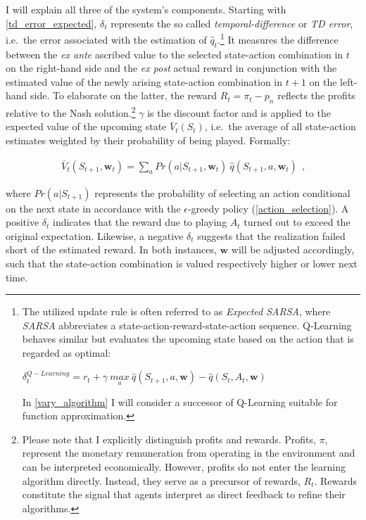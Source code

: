 I will explain all three of the system's components. Starting with \autoref{td_error_expected}, $\delta_t$ represents the so called \emph{temporal-difference} or \emph{TD error}, i.e.\ the error associated with the estimation of $\hat{q}_t$.\footnote{The utilized update rule is often referred to as \emph{Expected SARSA}, where \emph{SARSA} abbreviates a state-action-reward-state-action sequence. Q-Learning behaves similar but evaluates the upcoming state based on the action that is regarded as optimal:
	\begin{center}
		$\delta_t^{Q-Learning} = r_t + \gamma ~ \underset{a}{max} ~ \hat{q}(S_{t+1}, a, \boldsymbol{w}) - \hat{q}(S_t, A_t, \boldsymbol{w})$
	\end{center}
	In \autoref{vary_algorithm} I will consider a successor of Q-Learning suitable for function approximation.} It measures the difference between the \emph{ex ante} ascribed value to the selected state-action combination in $t$ on the right-hand side and the \emph{ex post} actual reward in conjunction with the estimated value of the newly arising state-action combination in $t+1$ on the left-hand side. To elaborate on the latter, the reward $R_t = \pi_t - p_n$ reflects the profits relative to the Nash solution.\footnote{Please note that I explicitly distinguish profits and rewards. Profits, $\pi$, represent the monetary remuneration from operating in the environment and can be interpreted economically. However, profits do not enter the learning algorithm directly. Instead, they serve as a precursor of rewards, $R_t$. Rewards constitute the signal that agents interpret as direct feedback to refine their algorithms.} $\gamma$ is the discount factor and is applied to the expected value of the upcoming state $\bar{V}_t(S_t)$, i.e.\ the average of all state-action estimates weighted by their probability of being played. Formally:

\begin{gather}\label{expected_state_value}
\bar{V}_t(S_{t+1}, \boldsymbol{w}_t) = \sum_{a} Pr(a|S_{t+1}, \boldsymbol{w}_t) ~ \hat{q}(S_{t+1}, a, \boldsymbol{w}_t) ~~   \text{,}
\end{gather}

where $Pr(a|S_{t+1})$ represents the probability of selecting an action conditional on the next state in accordance with the $\epsilon$-greedy policy (\autoref{action_selection}). A positive $\delta_t$ indicates that the reward due to playing $A_t$ turned out to exceed the original expectation. Likewise, a negative $\delta_t$ suggests that the realization failed short of the estimated reward. In both instances, $\boldsymbol{w}$ will be adjusted accordingly, such that the state-action combination is valued respectively higher or lower next time.

